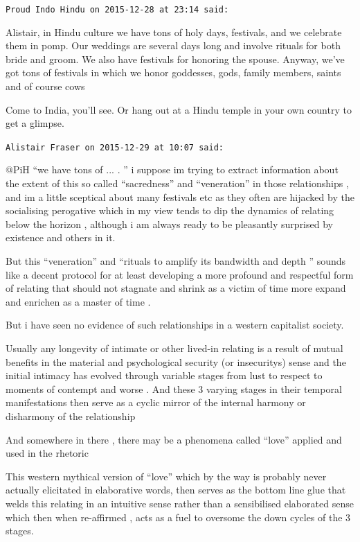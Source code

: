 \begin{footnotesize}
\begin{sffamily}
\texttt{Proud Indo Hindu on 2015-12-28 at 23:14 said:}

Alistair, in Hindu culture we have tons of holy days, festivals, and we celebrate them in pomp. Our weddings are several days long and involve rituals for both bride and groom. We also have festivals for honoring the spouse. Anyway, we've got tons of festivals in which we honor goddesses, gods, family members, saints and of course cows

Come to India, you'll see. Or hang out at a Hindu temple in your own country to get a glimpse.

\hfill

\texttt{Alistair Fraser on 2015-12-29 at 10:07 said:}

@PiH ``we have tons of ... . '' i suppose im trying to extract information about the extent of this so called ``sacredness'' and ``veneration'' in those relationships , and im a little sceptical about many festivals etc as they often are hijacked by the socialising perogative which in my view tends to dip the dynamics of relating below the horizon , although i am always ready to be pleasantly surprised by existence and others in it.

But this ``veneration'' and ``rituals to amplify its bandwidth and depth '' sounds like a decent protocol for at least developing a more profound and respectful form of relating that should not stagnate and shrink as a victim of time more expand and enrichen as a master of time .

But i have seen no evidence of such relationships in a western capitalist society.

Usually any longevity of intimate or other lived-in relating is a result of mutual benefits in the material and psychological security (or insecuritys) sense and the initial intimacy has evolved through variable stages from lust to respect to moments of contempt and worse . And these 3 varying stages in their temporal manifestations then serve as a cyclic mirror of the internal harmony or disharmony of the relationship

And somewhere in there , there may be a phenomena called ``love'' applied and used in the rhetoric

This western mythical version of ``love'' which by the way is probably never actually elicitated in elaborative words, then serves as the bottom line glue that welds this relating in an intuitive sense rather than a sensibilised elaborated sense which then when re-affirmed , acts as a fuel to oversome the down cycles of the 3 stages.


\end{sffamily}
\end{footnotesize}
